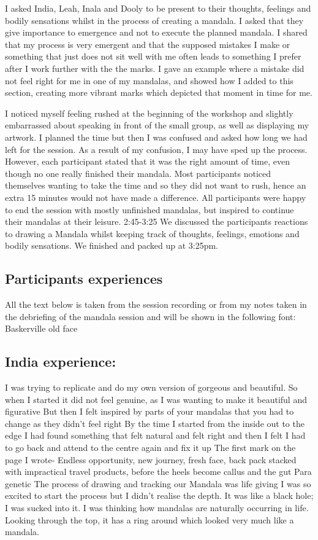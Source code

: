 I asked India, Leah, Inala and Dooly to be present to their thoughts, feelings and bodily sensations whilst in the process of creating a mandala. I asked that they give importance to emergence and not to execute the planned mandala. I shared that my process is very emergent and that the supposed mistakes I make or something that just does not sit well with me often leads to something I prefer after I work further with the the marks. I gave an example where a mistake did not feel right for me in one of my mandalas, and showed how I added to this section, creating more vibrant marks which depicted that moment in time for me. 

I noticed myself feeling rushed at the beginning of the workshop and slightly embarrassed about speaking in front of the small group, as well as displaying my artwork. I planned the time but then I was confused and asked how long we had left for the session. As a result of my confusion, I may have sped up the process. However, each participant stated that it was the right amount of time, even though no one really finished their mandala. Most participants noticed themselves wanting to take the time and so they did not want to rush, hence an extra 15 minutes would not have made a difference. All participants were happy to end the session with mostly unfinished mandalas, but inspired to continue their mandalas at their leisure. 
2:45-3:25
We discussed the participants reactions to drawing a Mandala whilst keeping track of thoughts, feelings, emotions and bodily sensations. We finished and packed up at 3:25pm. 

\subsection{Participants experiences}

All the text below is taken from the session recording or from my notes taken in the debriefing of the mandala session and will be shown in the following font: Baskerville old face 

\subsection{India experience:}
I was trying to replicate and do my own version of gorgeous and beautiful. So when I started it did not feel genuine, as I was wanting to make it beautiful and figurative
But then I felt inspired by parts of your mandalas that you had to change as they didn't feel right
By the time I started from the inside out to the edge I had found something that felt natural and felt right and then I felt I had to go back and attend to the centre again and fix it up
The first mark on the page I wrote- Endless opportunity, new journey, fresh face, back pack stacked with impractical travel products, before the heels become callus and the gut Para genetic
The process of drawing and tracking our Mandala was life giving
I was so excited to start the process but I didn't realise the depth. It was like a black hole; I was sucked into it.
I was thinking how mandalas are naturally occurring in life. Looking through the top, it has a ring around which looked very much like a mandala.

